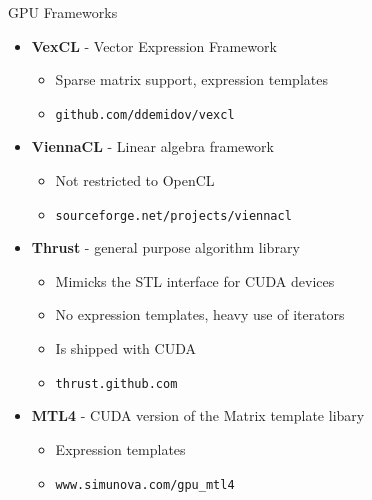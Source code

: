 \documentclass{beamer}
\newcommand{\heading}[1]{\centerline{\Large #1} \vspace{0.5em}}
\begin{document}
\begin{frame}[fragile]
 \heading{GPU Frameworks}

\begin{itemize}
 \item \textbf{VexCL} - Vector Expression Framework
   \begin{itemize}
     \item Sparse matrix support, expression templates
     \item {\tt github.com/ddemidov/vexcl}
   \end{itemize}
\end{itemize}
\begin{itemize}
 \item \textbf{ViennaCL} - Linear algebra framework 
   \begin{itemize}
     \item Not restricted to OpenCL
     \item {\tt sourceforge.net/projects/viennacl}
   \end{itemize}
\end{itemize}
\begin{itemize}
 \item \textbf{Thrust} - general purpose algorithm library
   \begin{itemize}
     \item Mimicks the STL interface for CUDA devices
     \item No expression templates, heavy use of iterators
     \item Is shipped with CUDA
       \item {\tt thrust.github.com}
   \end{itemize}
\end{itemize}
\begin{itemize}
 \item \textbf{MTL4} - CUDA version of the Matrix template libary
   \begin{itemize}
     \item Expression templates
     \item {\tt www.simunova.com/gpu\_mtl4}
   \end{itemize}
\end{itemize}

\end{frame}
\end{document}
